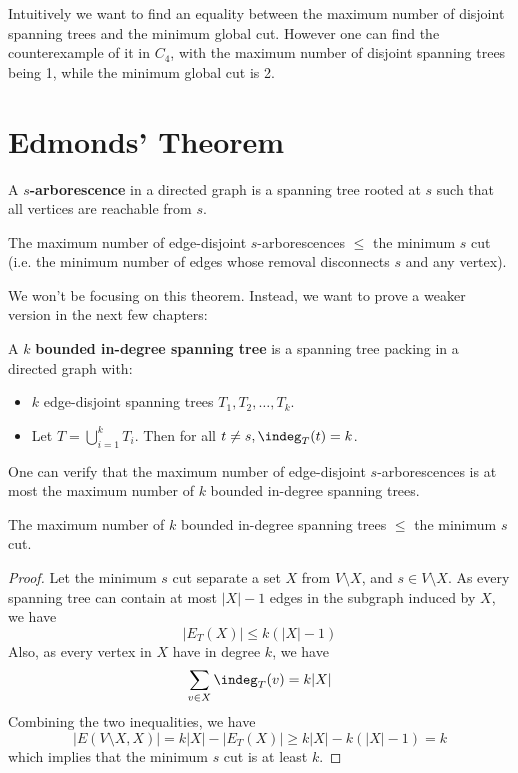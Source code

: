 \begin{note}
	Intuitively we want to find an equality between the maximum number of disjoint spanning trees and the minimum global cut. However one can find the counterexample of it in $C_4$, with the maximum number of disjoint spanning trees being 1, while the minimum global cut is 2.
\end{note}

\section{Edmonds' Theorem}

\begin{definition}
	A $s$\textbf{-arborescence} in a directed graph is a spanning tree rooted at $s$ such that all vertices are reachable from $s$.
\end{definition}
\begin{claim}
	The maximum number of edge-disjoint $s$-arborescences $\le$ the minimum $s$ cut (i.e. the minimum number of edges whose removal disconnects $s$ and any vertex).
\end{claim}

We won't be focusing on this theorem. Instead, we want to prove a weaker version in the next few chapters:

\begin{definition}
	A $k$ \textbf{bounded in-degree spanning tree} is a spanning tree packing in a directed graph with:
	\begin{itemize}
		\item $k$ edge-disjoint spanning trees $T_1, T_2, \ldots, T_k$.
		\item Let $T = \bigcup_{i=1}^k T_i$. Then for all $t \neq s, \indeg_T(t) = k$.
	\end{itemize}
\end{definition}

One can verify that the maximum number of edge-disjoint $s$-arborescences is at most the maximum number of $k$ bounded in-degree spanning trees.

\begin{claim}
	The maximum number of $k$ bounded in-degree spanning trees $\le$ the minimum $s$ cut.
\end{claim}
\begin{proof}
	Let the minimum $s$ cut separate a set $X$ from $V\setminus X$, and $s\in V\setminus X$. As every spanning tree can contain at most $|X|-1$ edges in the subgraph induced by $X$, we have
	\[|E_T(X)|\le k(|X|-1)\]
	Also, as every vertex in $X$ have in degree $k$, we have
	\[ \sum_{v\in X} \indeg_T(v) = k|X| \]
	Combining the two inequalities, we have
	\[ |E(V\setminus X, X)| = k|X| - |E_T(X)| \ge k|X| - k(|X|-1) = k \]
	which implies that the minimum $s$ cut is at least $k$.
\end{proof}

